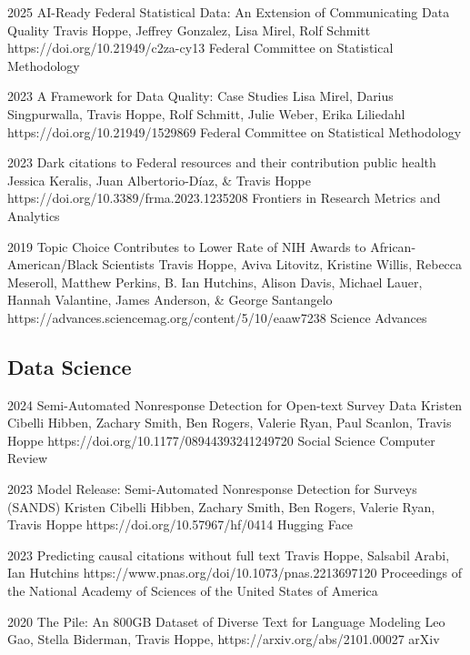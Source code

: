 \documentclass[]{scrartcl}
\begin{document}
\begin{cleanCV}
\Paper
{2025}
{AI-Ready Federal Statistical Data: An Extension of Communicating Data Quality}
{Travis Hoppe, Jeffrey Gonzalez, Lisa Mirel, Rolf Schmitt}
{https://doi.org/10.21949/c2za-cy13}
{Federal Committee on Statistical Methodology}

\Paper
{2023}
{A Framework for Data Quality: Case Studies}
{Lisa Mirel, Darius Singpurwalla, Travis Hoppe, Rolf Schmitt, Julie Weber, Erika Liliedahl}
{https://doi.org/10.21949/1529869}
{Federal Committee on Statistical Methodology}

\Paper
{2023}
{Dark citations to Federal resources and their contribution public health}
{Jessica Keralis, Juan Albertorio-Díaz, \& Travis Hoppe}
{https://doi.org/10.3389/frma.2023.1235208}
{Frontiers in Research Metrics and Analytics}

\Paper
{2019}
{Topic Choice Contributes to Lower Rate of NIH Awards to African-American/Black Scientists}
{Travis Hoppe, Aviva Litovitz, Kristine Willis, Rebecca Meseroll, Matthew Perkins, B. Ian Hutchins, Alison Davis, Michael Lauer, Hannah Valantine, James Anderson, \& George Santangelo}
{https://advances.sciencemag.org/content/5/10/eaaw7238}
{Science Advances}


\subsection{Data Science}


\Paper
{2024}
{Semi-Automated Nonresponse Detection for Open-text Survey Data}
{Kristen Cibelli Hibben, Zachary Smith, Ben Rogers, Valerie Ryan, Paul Scanlon, Travis Hoppe}
{https://doi.org/10.1177/08944393241249720}
{Social Science Computer Review}

\Paper
{2023}
{Model Release: Semi-Automated Nonresponse Detection for Surveys (SANDS)}
{Kristen Cibelli Hibben, Zachary Smith, Ben Rogers, Valerie Ryan, Travis Hoppe}
{https://doi.org/10.57967/hf/0414}
{Hugging Face}

\Paper
{2023}
{Predicting causal citations without full text}
{Travis Hoppe, Salsabil Arabi, Ian Hutchins}
{https://www.pnas.org/doi/10.1073/pnas.2213697120}
{Proceedings of the National Academy of Sciences of the United States of America}

\Paper
{2020}
{The Pile: An 800GB Dataset of Diverse Text for Language Modeling}
{Leo Gao, Stella Biderman, Travis Hoppe, \etal}
{https://arxiv.org/abs/2101.00027}
{arXiv}


\end{cleanCV}
\end{document}
